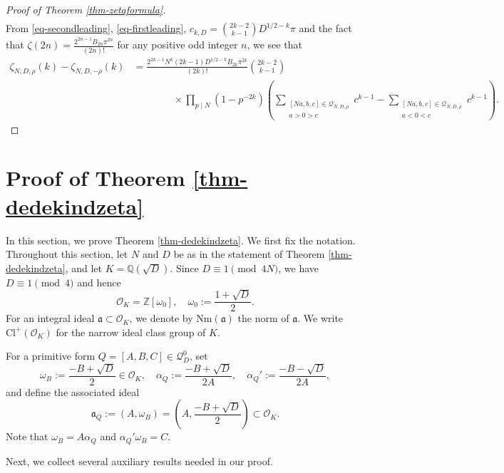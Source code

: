 \documentclass[12pt]{amsart}
\numberwithin{equation}{section}
\theoremstyle{definition}
\begin{document}
\begin{proof}[Proof of Theorem \ref{thm-zetaformula}]
\begin{equation}
\begin{split}
        \end{split}
    \end{equation}
    From \eqref{eq-secondleading}, \eqref{eq-firstleading}, $c_{k,D}=\binom{2k-2}{k-1}D^{1/2-k}\pi$ and the fact that $\zeta(2n)=\frac{2^{2n-1}B_{2n}\pi^{2n}}{(2n)!}$ for any positive odd integer $n$, we see that
    \begin{align*}
        \zeta_{N,D,\rho}(k)-\zeta_{N,D,-\rho}(k)&=\frac{2^{2k-1}N^{k}(2k-1)D^{1/2-k}B_{2k}\pi^{2k}}{(2k)!}\binom{2k-2}{k-1}\\
        &\qquad\qquad\times\prod_{p\mid N}(1-p^{-2k})\left(\sum\limits_{\substack{[Na,b,c]\in\mathcal{Q}_{N,D,\rho} \\ a>0>c}}c^{k-1}-\sum\limits_{\substack{[Na,b,c]\in\mathcal{Q}_{N,D,\rho} \\ a<0<c}}c^{k-1}\right).
    \end{align*}
\end{proof}

\section{Proof of Theorem \ref{thm-dedekindzeta}}\label{sec-dedekindzeta}

In this section, we prove Theorem \ref{thm-dedekindzeta}.
We first fix the notation.
Throughout this section, let $N$ and $D$ be as in the statement of Theorem \ref{thm-dedekindzeta}, and let $K=\mathbb{Q}(\sqrt{D})$. Since $D\equiv 1\pmod{4N}$, we have $D\equiv 1\pmod{4}$ and hence
$$\mathcal{O}_{K}=\mathbb{Z}\left[\omega_{0}\right],\quad\omega_{0}:=\frac{1+\sqrt{D}}{2}.$$
For an integral ideal $\mathfrak{a}\subset\mathcal{O}_{K}$, we denote by $\mathrm{Nm}(\mathfrak{a})$ the norm of $\mathfrak{a}$.
We write $\mathrm{Cl}^{+}(\mathcal{O}_{K})$ for the narrow ideal class group of $K$.

For a primitive form $Q=[A,B,C]\in\mathcal{Q}_D^{0}$, set
$$\omega_{B}:=\frac{-B+\sqrt{D}}{2}\in\mathcal{O}_{K},\quad\alpha_{Q}:=\frac{-B+\sqrt{D}}{2A},\quad\alpha_{Q}':=\frac{-B-\sqrt{D}}{2A},$$
and define the associated ideal
$$\mathfrak{a}_{Q}:=(A,\omega_{B})=\left(A,\frac{-B+\sqrt{D}}{2}\right)\subset\mathcal{O}_{K}.$$
Note that $\omega_{B}=A\alpha_{Q}$ and $\alpha_{Q}'\omega_{B}=C$.

Next, we collect several auxiliary results needed in our proof.
\end{document}
